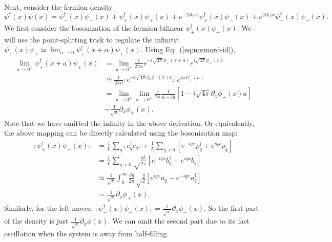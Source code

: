 \documentclass{SciPost}
\newcommand{\normord}[1]{{:\mathrel{#1}:}}
\begin{document}
Next, consider the fermion density
\begin{equation*}
	\psi^\dagger(x)\psi(x) = \psi_-^\dagger(x)\psi_-(x) + \psi_+^\dagger(x)\psi_+(x) + e^{-2ik_F x} \psi_+^\dagger(x)\psi_-(x)+e^{2ik_F x}\psi_-^\dagger(x)\psi_+(x).
\end{equation*}
We first consider the bosonization of the fermion bilinear $\psi_+^\dagger(x)\psi_+(x)$.
We will use the point-splitting trick to regulate the infinity: $\psi^\dagger_+(x)\psi_+ \simeq \lim_{\alpha\rightarrow 0} \psi_+^\dagger(x+\alpha)\psi_+(x)$.
Using Eq.~(\ref{eq:normord-id}), 
\begin{equation*}
\begin{aligned}
	\lim_{a\rightarrow 0^+}\psi_+^\dagger(x+a)\psi_+(x)
	&= \lim_{a\rightarrow 0^+}\frac{1}{2\pi \alpha} e^{-i\sqrt{4\pi}\phi_+(x+a)}e^{i\sqrt{4\pi}\phi_+(x)} \\
	&\simeq \frac{1}{2\pi \alpha} \normord{e^{-i\sqrt{4\pi}\partial_x\phi_+(x)a}} \ e^{4\pi G_+(a)} \\
	&= \lim_{a\rightarrow 0^+}\lim_{\alpha\rightarrow 0^+}\frac{1}{2\pi} \frac{1}{\alpha-ia} \left[1-i\sqrt{4\pi}\partial_x\phi_+(x)a \right] \\
	&\sim \frac{1}{\sqrt\pi} \partial_x\phi_+(x).
\end{aligned}
\end{equation*}
Note that we have omitted the infinity in the above derivation.
Or equivalently, the above mapping can be directly calculated using the bosonization map:
\begin{equation*}
\begin{aligned}
	\normord{\psi_+^\dagger(x)\psi_+(x)}
	&= \frac{1}{L}\sum_{q} {:\mathrel{c_{q}^\dagger c_{q}}:} + \frac{1}{L}\sum_{q>0}[e^{-iqx}\rho^\dagger_{q}+e^{iqx}\rho_{q}] \\
	&= \frac{1}{L}\sum_{q>0} \sqrt\frac{qL}{2\pi} [e^{-iqx}b^\dagger_{q}+e^{iqx}b_{q}] \\
	&\simeq \frac{1}{\sqrt{\pi}} \int_0^\infty \frac{dq}{2\pi} \sqrt\frac{q}{2} \left[e^{iqx}a_{q} - e^{-iqx}a^\dagger_{q}\right] \\
	&= \frac{1}{\sqrt\pi} \partial_x\phi_+(x).
\end{aligned}
\end{equation*}
Similarly, for the left mover, $\normord{\psi_-^\dagger(x)\psi_-(x)}= \frac{1}{\sqrt\pi} \partial_x\phi_-(x)$.
So the first part of the density is just $\frac{1}{\sqrt\pi}\partial_x\phi(x)$.
We can omit the second part due to its fast oscillation when the system is away from half-filling.
\end{document}
